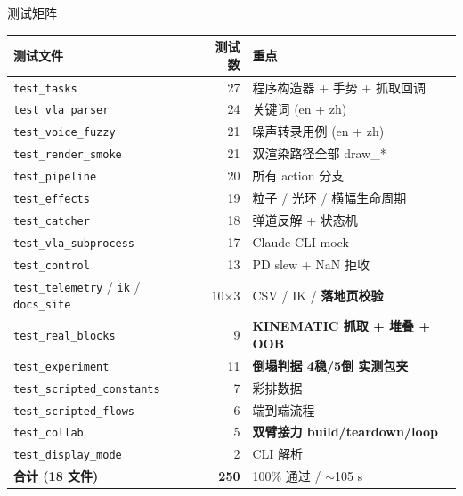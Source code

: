 \documentclass[aspectratio=169, 11pt]{beamer}
\begin{document}
\begin{frame}{测试矩阵}
\centering\footnotesize
\setlength{\tabcolsep}{5pt}\renewcommand{\arraystretch}{0.92}
\begin{tabular}{lrl}
\toprule
测试文件 & 测试数 & 重点 \\
\midrule
\texttt{test\_tasks}               & 27 & 程序构造器 + 手势 + 抓取回调 \\
\texttt{test\_vla\_parser}         & 24 & 关键词 (en + zh) \\
\texttt{test\_voice\_fuzzy}        & 21 & 噪声转录用例 (en + zh) \\
\texttt{test\_render\_smoke}       & 21 & 双渲染路径全部 draw\_* \\
\texttt{test\_pipeline}            & 20 & 所有 action 分支 \\
\texttt{test\_effects}             & 19 & 粒子 / 光环 / 横幅生命周期 \\
\texttt{test\_catcher}             & 18 & 弹道反解 + 状态机 \\
\texttt{test\_vla\_subprocess}     & 17 & Claude CLI mock \\
\texttt{test\_control}             & 13 & PD slew + NaN 拒收 \\
\texttt{test\_telemetry} / \texttt{ik} / \texttt{docs\_site} & 10$\times$3 & CSV / IK / \textbf{落地页校验} \\
\texttt{test\_real\_blocks}        & 9  & \textbf{KINEMATIC 抓取 + 堆叠 + OOB} \\
\texttt{test\_experiment}         & 11 & \textbf{倒塌判据 4稳/5倒 实测包夹} \\
\texttt{test\_scripted\_constants} & 7  & 彩排数据 \\
\texttt{test\_scripted\_flows}     & 6  & 端到端流程 \\
\texttt{test\_collab}              & 5  & \textbf{双臂接力 build/teardown/loop} \\
\texttt{test\_display\_mode}       & 2  & CLI 解析 \\
\midrule
\textbf{合计 (18 文件)}            & \textbf{250} & 100\% 通过 / $\sim$105 s \\
\bottomrule
\end{tabular}
\end{frame}
\end{document}
